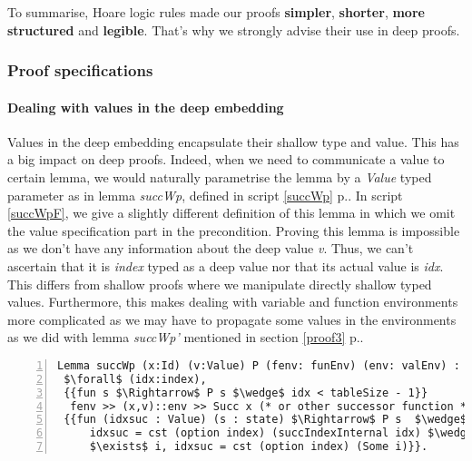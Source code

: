 To summarise, Hoare logic rules made our proofs \textbf{simpler}, \textbf{shorter}, \textbf{more structured} and \textbf{legible}. That's why we strongly advise their use in deep proofs. \pagebreak

\subsubsection{Proof specifications}
\paragraph{Dealing with values in the deep embedding}
Values in the deep embedding encapsulate their shallow type and value. This has a big impact on deep proofs. Indeed, when we need to communicate a value to certain lemma, we would naturally parametrise the lemma by a \textit{Value} typed parameter as in lemma \textit{succWp}, defined in script \ref{succWp} p.\pageref{succWp}. In script \ref{succWpF}, we give a slightly different definition of this lemma in which we omit the value specification part in the precondition. Proving this lemma is impossible as we don't have any information about the deep value \textit{v}. Thus, we can't ascertain that it is \textit{index} typed as a deep value nor that its actual value is \textit{idx}. This differs from shallow proofs where we manipulate directly shallow typed values. Furthermore, this makes dealing with variable and function environments more complicated as we may have to propagate some values in the environments as we did with lemma \textit{succWp'} mentioned in section \ref{proof3} p.\pageref{proof3}.
\begin{lstlisting}[caption = {succWp false lemma definition},numbers=left, xleftmargin=-.06\textwidth,
xrightmargin=-.06\textwidth, mathescape=true,label={succWpF}]
Lemma succWp (x:Id) (v:Value) P (fenv: funEnv) (env: valEnv) :
 $\forall$ (idx:index), 
 {{fun s $\Rightarrow$ P s $\wedge$ idx < tableSize - 1}} 
  fenv >> (x,v)::env >> Succ x (* or other successor function *) 
 {{fun (idxsuc : Value) (s : state) $\Rightarrow$ P s  $\wedge$
	 idxsuc = cst (option index) (succIndexInternal idx) $\wedge$
	 $\exists$ i, idxsuc = cst (option index) (Some i)}}.
\end{lstlisting} \vspace{4pt}

